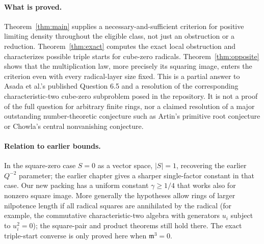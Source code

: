 \documentclass[11pt]{article}
\theoremstyle{remark}\newtheorem{remark}[theorem]{Remark}
\newcommand{\m}{\mathfrak m}
\begin{document}
\paragraph{What is proved.} Theorem~\ref{thm:main} supplies a necessary-and-sufficient criterion for positive limiting density throughout the eligible class, not just an obstruction or a reduction. Theorem~\ref{thm:exact} computes the exact local obstruction and characterizes possible triple starts for cube-zero radicals. Theorem~\ref{thm:opposite} shows that the multiplication law, more precisely its squaring image, enters the criterion even with every radical-layer size fixed. This is a partial answer to Asada et al.'s published Question 6.5 and a resolution of the corresponding characteristic-two cube-zero subproblem posed in the repository. It is not a proof of the full question for arbitrary finite rings, nor a claimed resolution of a major outstanding number-theoretic conjecture such as Artin's primitive root conjecture or Chowla's central nonvanishing conjecture.

\paragraph{Relation to earlier bounds.} In the square-zero case $S=0$ as a vector space, $|S|=1$, recovering the earlier $Q^{-2}$ parameter; the earlier chapter gives a sharper single-factor constant in that case. Our new packing has a uniform constant $\gamma\ge1/4$ that works also for nonzero square image. More generally the hypotheses allow rings of larger nilpotence length if all radical squares are annihilated by the radical (for example, the commutative characteristic-two algebra with generators $u_i$ subject to $u_i^2=0$); the square-pair and product theorems still hold there. The exact triple-start converse is only proved here when $\m^3=0$.
\end{document}
